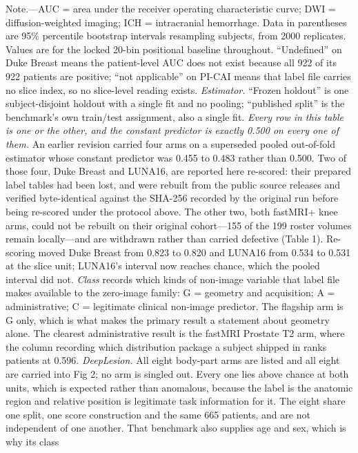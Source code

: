 \documentclass[11pt,letterpaper]{article}
\begin{document}
\begin{singlespace}
\vspace{0.4em}
{\scriptsize
Note.---AUC = area under the receiver operating characteristic curve; DWI =
diffusion-weighted imaging; ICH = intracranial hemorrhage. Data in parentheses
are 95\% percentile bootstrap intervals resampling subjects, from 2000
replicates. Values are for the locked 20-bin positional baseline throughout.
``Undefined'' on Duke Breast means the patient-level AUC does not exist because
all 922 of its 922 patients are positive; ``not applicable'' on PI-CAI means that
label file carries no slice index, so no slice-level reading exists.
\emph{Estimator.} ``Frozen holdout'' is one subject-disjoint holdout with a
single fit and no pooling; ``published split'' is the benchmark's own train/test
assignment, also a single fit. \emph{Every row in this table is one or the other,
and the constant predictor is exactly 0.500 on every one of them.} An earlier
revision carried four arms on a superseded pooled out-of-fold estimator whose
constant predictor was 0.455 to 0.483 rather than 0.500. Two of those four, Duke
Breast and LUNA16, are reported here re-scored: their prepared label tables had
been lost, and were rebuilt from the public source releases and verified
byte-identical against the SHA-256 recorded by the original run before being
re-scored under the protocol above. The other two, both fastMRI+ knee arms, could
not be rebuilt on their original cohort---155 of the 199 roster volumes remain
locally---and are withdrawn rather than carried defective (Table 1). Re-scoring
moved Duke Breast from 0.823 to 0.820 and LUNA16 from 0.534 to 0.531 at the slice
unit; LUNA16's interval now reaches chance, which the pooled interval did not.
\emph{Class} records which kinds of non-image variable that label file makes
available to the zero-image family: G = geometry and acquisition; A =
administrative; C = legitimate clinical non-image predictor. The flagship arm is
G only, which is what makes the primary result a statement about geometry alone.
The clearest administrative result is the fastMRI Prostate T2 arm, where the
column recording which distribution package a subject shipped in ranks patients
at 0.596.
\emph{DeepLesion.} All eight body-part arms are listed and all eight are carried
into Fig 2; no arm is singled out. Every one lies above chance at both units,
which is expected rather than anomalous, because the label is the anatomic region
and relative position is legitimate task information for it. The eight share one
split, one score construction and the same 665 patients, and are not independent
of one another. That benchmark also supplies age and sex, which is why its class
}
\end{singlespace}
\end{document}
